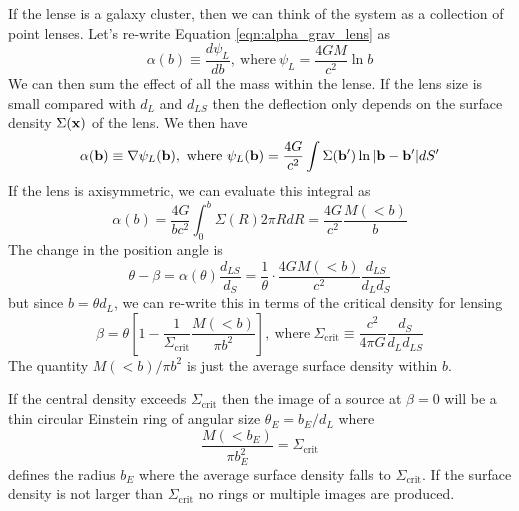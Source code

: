 \documentclass[]{article}
\begin{document}
If the lense is a galaxy cluster, then we can
think of the system as a collection of point lenses.
Let's re-write Equation \ref{eqn:alpha_grav_lens} as
\begin{equation}
\alpha(b) \equiv \frac{d \psi_L}{db},~\mathrm{where}~\psi_L = \frac{4 GM}{c^2}\ln b
\end{equation}
\noindent
We can then sum the effect of all the mass within the lense.
If the lens size is small compared with $d_L$ and $d_{LS}$ then
the deflection only depends on the surface density $\Sigma(\mathbf{x})$
of the lens.  We then have
\begin{equation}
\alpha(\mathbf{b}) \equiv \nabla \psi_L(\mathbf{b}),~\mathrm{where}~\psi_L(\mathbf{b}) = \frac{4G}{c^2}\int \Sigma(\mathbf{b}') \ln |\mathbf{b} - \mathbf{b}'| dS'
\end{equation}
\noindent
If the lens is axisymmetric, we can evaluate this integral as
\begin{equation}
\alpha(b) = \frac{4G}{bc^2}\int_{0}^{b} \Sigma(R) 2 \pi R dR = \frac{4G}{c^2} \frac{M(<b)}{b}
\end{equation}
\noindent
The change in the position angle is
\begin{equation}
\theta - \beta = \alpha(\theta)\frac{d_{LS}}{d_S} = \frac{1}{\theta} \cdot \frac{4GM(<b)}{c^2}\frac{d_{LS}}{d_L d_S}
\end{equation}
\noindent
but since $b = \theta d_L$, we can re-write this in terms of the critical density for lensing
\begin{equation}
\beta = \theta\left[1 - \frac{1}{\Sigma_{\mathrm{crit}}}\frac{M(<b)}{\pi b^2}\right],~\mathrm{where}~\Sigma_{\mathrm{crit}} \equiv \frac{c^2}{4\pi G}\frac{d_S}{d_L d_{LS}}
\end{equation}
\noindent
The quantity $M(<b)/\pi b^2$ is just the average surface density within $b$.

If the central density exceeds $\Sigma_{\mathrm{crit}}$ then the image of a
source at $\beta=0$ will be a thin circular Einstein ring of angular size $\theta_{E} = b_E/d_L$
where
\begin{equation}
\frac{M(<b_E)}{\pi b_E^2} = \Sigma_{\mathrm{crit}}
\end{equation}
defines the radius $b_E$ where the average surface density falls to $\Sigma_{\mathrm{crit}}$. If
the surface density is not larger than $\Sigma_\mathrm{crit}$ no rings or multiple images are produced.
\end{document}
